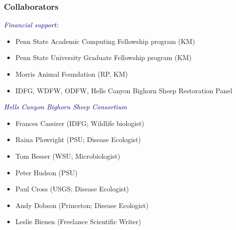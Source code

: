 \documentclass[fleqn,xcolor=table]{beamer}
\begin{document}
{

\begin{frame}[t]
\frametitle{Collaborators}
\vspace{.1in}

\tiny{
\textcolor{navy}{\textit{Financial support:}}
\begin{itemize}
  \item[] Penn State Academic Computing Fellowship program (KM)
  \item[] Penn State University Graduate Fellowship program (KM)
  \item[] Morris Animal Foundation (RP, KM)
  \item[] IDFG, WDFW, ODFW, Hells Canyon Bighorn Sheep Restoration Panel 
\end{itemize}
\vspace{.2in}

\textcolor{navy}{\textit{Hells Canyon Bighorn Sheep Consortium}}
\begin{itemize}
  \item[] Frances Cassirer (IDFG; Wildlife biologist)
  \item[] Raina Plowright (PSU; Disease Ecologist)
  \item[] Tom Besser (WSU; Microbiologist)
  \item[] Peter Hudson (PSU)
  \item[] Paul Cross (USGS; Disease Ecologist)
  \item[] Andy Dobson (Princeton; Disease Ecologist)
  \item[] Leslie Bienen (Freelance Scientific Writer)
\end{itemize}
\vspace{.1in}
}
\end{frame}
}
\end{document}

